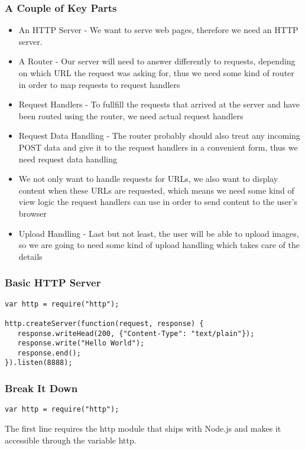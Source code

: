 \documentclass[ignorenonframetext,]{beamer}
\begin{document}
\begin{frame}\frametitle{A Couple of Key Parts}

\begin{itemize}
\item
  An HTTP Server - We want to serve web pages, therefore we need an HTTP
  server.
\item
  A Router - Our server will need to answer differently to requests,
  depending on which URL the request was asking for, thus we need some
  kind of router in order to map requests to request handlers
\item
  Request Handlers - To fullfill the requests that arrived at the server
  and have been routed using the router, we need actual request handlers
\item
  Request Data Handling - The router probably should also treat any
  incoming POST data and give it to the request handlers in a convenient
  form, thus we need request data handling
\item
  We not only want to handle requests for URLs, we also want to display
  content when these URLs are requested, which means we need some kind
  of view logic the request handlers can use in order to send content to
  the user's browser
\item
  Upload Handling - Last but not least, the user will be able to upload
  images, so we are going to need some kind of upload handling which
  takes care of the details
\end{itemize}
\end{frame}

\begin{frame}[fragile]\frametitle{Basic HTTP Server}

\begin{verbatim}
var http = require("http");

http.createServer(function(request, response) {
   response.writeHead(200, {"Content-Type": "text/plain"});
   response.write("Hello World");
   response.end();
}).listen(8888);
\end{verbatim}
\end{frame}

\begin{frame}[fragile]\frametitle{Break It Down}

\begin{verbatim}
var http = require("http");
\end{verbatim}
The first line requires the http module that ships with Node.js and
makes it accessible through the variable http.

\end{frame}
\end{document}
